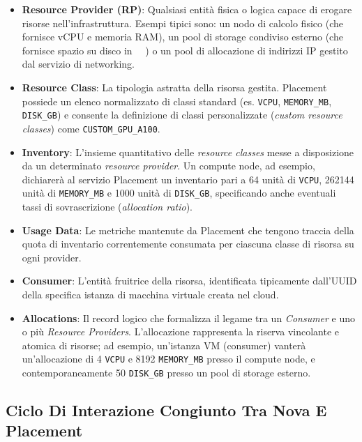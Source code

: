 \documentclass[11pt, a4paper]{article}
\begin{document}
\begin{itemize}
    \item \textbf{Resource Provider (RP)}: Qualsiasi entità fisica o logica capace di erogare risorse nell'infrastruttura. Esempi tipici sono: un nodo di calcolo fisico (che fornisce vCPU e memoria RAM), un pool di storage condiviso esterno (che fornisce spazio su disco in \SI{}{\giga\byte}) o un pool di allocazione di indirizzi IP gestito dal servizio di networking.
    \item \textbf{Resource Class}: La tipologia astratta della risorsa gestita. Placement possiede un elenco normalizzato di classi standard (es. \texttt{VCPU}, \texttt{MEMORY\_MB}, \texttt{DISK\_GB}) e consente la definizione di classi personalizzate (\emph{custom resource classes}) come \texttt{CUSTOM\_GPU\_A100}.
    \item \textbf{Inventory}: L'insieme quantitativo delle \emph{resource classes} messe a disposizione da un determinato \emph{resource provider}. Un compute node, ad esempio, dichiarerà al servizio Placement un inventario pari a 64 unità di \texttt{VCPU}, 262144 unità di \texttt{MEMORY\_MB} e 1000 unità di \texttt{DISK\_GB}, specificando anche eventuali tassi di sovrascrizione (\emph{allocation ratio}).
    \item \textbf{Usage Data}: Le metriche mantenute da Placement che tengono traccia della quota di inventario correntemente consumata per ciascuna classe di risorsa su ogni provider.
    \item \textbf{Consumer}: L'entità fruitrice della risorsa, identificata tipicamente dall'UUID della specifica istanza di macchina virtuale creata nel cloud.
    \item \textbf{Allocations}: Il record logico che formalizza il legame tra un \emph{Consumer} e uno o più \emph{Resource Providers}. L'allocazione rappresenta la riserva vincolante e atomica di risorse; ad esempio, un'istanza VM (consumer) vanterà un'allocazione di 4 \texttt{VCPU} e 8192 \texttt{MEMORY\_MB} presso il compute node, e contemporaneamente 50 \texttt{DISK\_GB} presso un pool di storage esterno.
\end{itemize}

\subsection{Ciclo Di Interazione Congiunto Tra Nova E Placement}
\end{document}
